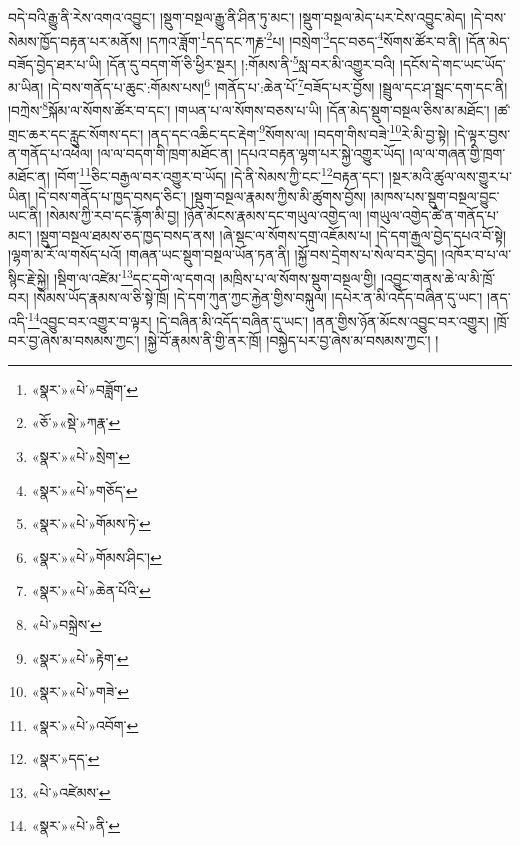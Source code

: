 བདེ་བའི་རྒྱུ་ནི་རེས་འགའ་འབྱུང་། །སྡུག་བསྔལ་རྒྱུ་ནི་ཤིན་ཏུ་མང་། །སྡུག་བསྔལ་མེད་པར་ངེས་འབྱུང་མེད། །དེ་བས་སེམས་ཁྱོད་བརྟན་པར་མནོས། །དཀའ་ཟློག་\footnote{«སྣར་»«པེ་»བཟློག་}དད་དང་ཀརྞ་\footnote{«ཅོ་»«སྡེ་»ཀརྣ་}པ། །བསྲེག་\footnote{«སྣར་»«པེ་»སྲེག་}དང་བཅད་\footnote{«སྣར་»«པེ་»གཅོད་}སོགས་ཚོར་བ་ནི། །དོན་མེད་བཟོད་བྱེད་ཐར་པ་ཡི། །དོན་དུ་བདག་གོ་ཅི་ཕྱིར་སྔར། །:གོམས་ནི་\footnote{«སྣར་»«པེ་»གོམས་ཏེ་}སླ་བར་མི་འགྱུར་བའི། །དངོས་དེ་གང་ཡང་ཡོད་མ་ཡིན། །དེ་བས་གནོད་པ་ཆུང་:གོམས་པས།\footnote{«སྣར་»«པེ་»གོམས་ཤིང་།} །གནོད་པ་:ཆེན་པོ་\footnote{«སྣར་»«པེ་»ཆེན་པོའི་}བཟོད་པར་བྱོས། །སྦྲུལ་དང་ཤ་སྦྲང་དག་དང་ནི། །བཀྲེས་\footnote{«པེ་»བསྐྲེས་}སྐོམ་ལ་སོགས་ཚོར་བ་དང་། །གཡན་པ་ལ་སོགས་བཅས་པ་ཡི། །དོན་མེད་སྡུག་བསྔལ་ཅིས་མ་མཐོང་། །ཚ་གྲང་ཆར་དང་རླུང་སོགས་དང་། །ནད་དང་འཆིང་དང་རྡེག་\footnote{«སྣར་»«པེ་»རྟེག་}སོགས་ལ། །བདག་གིས་བཟེ་\footnote{«སྣར་»«པེ་»གཟེ་}རེ་མི་བྱ་སྟེ། །དེ་ལྟར་བྱས་ན་གནོད་པ་འཕེལ། །ལ་ལ་བདག་གི་ཁྲག་མཐོང་ན། །དཔའ་བརྟན་ལྷག་པར་སྐྱེ་འགྱུར་ཡོད། །ལ་ལ་གཞན་གྱི་ཁྲག་མཐོང་ན། །བོག་\footnote{«སྣར་»«པེ་»འབོག་}ཅིང་བརྒྱལ་བར་འགྱུར་བ་ཡོད། །དེ་ནི་སེམས་ཀྱི་ངང་\footnote{«སྣར་»དད་}བརྟན་དང་། །སྔར་མའི་ཚུལ་ལས་གྱུར་པ་ཡིན། །དེ་བས་གནོད་པ་ཁྱད་བསད་ཅིང་། །སྡུག་བསྔལ་རྣམས་ཀྱིས་མི་ཚུགས་བྱོས། །མཁས་པས་སྡུག་བསྔལ་བྱུང་ཡང་ནི། །སེམས་ཀྱི་རབ་དང་རྙོག་མི་བྱ། །ཉོན་མོངས་རྣམས་དང་གཡུལ་འགྱེད་ལ། །གཡུལ་འགྱེད་ཚེ་ན་གནོད་པ་མང་། །སྡུག་བསྔལ་ཐམས་ཅད་ཁྱད་བསད་ནས། །ཞེ་སྡང་ལ་སོགས་དགྲ་འཇོམས་པ། །དེ་དག་རྒྱལ་བྱེད་དཔའ་བོ་སྟེ། །ལྷག་མ་རོ་ལ་གསོད་པའོ། །གཞན་ཡང་སྡུག་བསྔལ་ཡོན་ཏན་ནི། །སྐྱོ་བས་དྲེགས་པ་སེལ་བར་བྱེད། །འཁོར་བ་པ་ལ་སྙིང་རྗེ་སྐྱེ། །སྡིག་ལ་འཛེམ་\footnote{«པེ་»འཛེམས་}དང་དགེ་ལ་དགའ། །མཁྲིས་པ་ལ་སོགས་སྡུག་བསྔལ་གྱི། །འབྱུང་གནས་ཆེ་ལ་མི་ཁྲོ་བར། །སེམས་ཡོད་རྣམས་ལ་ཅི་སྟེ་ཁྲོ། །དེ་དག་ཀུན་ཀྱང་རྐྱེན་གྱིས་བསྐུལ། །དཔེར་ན་མི་འདོད་བཞིན་དུ་ཡང་། །ནད་འདི་\footnote{«སྣར་»«པེ་»ནི་}འབྱུང་བར་འགྱུར་བ་ལྟར། །དེ་བཞིན་མི་འདོད་བཞིན་དུ་ཡང་། །ནན་གྱིས་ཉོན་མོངས་འབྱུང་བར་འགྱུར། །ཁྲོ་བར་བྱ་ཞེས་མ་བསམས་ཀྱང་། །སྐྱེ་བོ་རྣམས་ནི་གྱི་ནར་ཁྲོ། །བསྐྱེད་པར་བྱ་ཞེས་མ་བསམས་ཀྱང་། །
